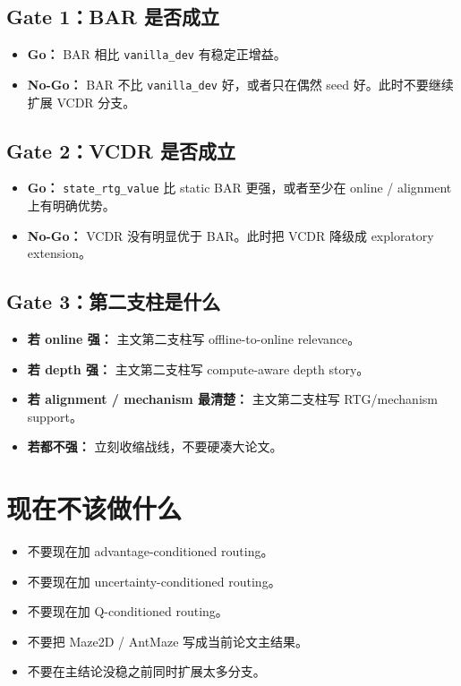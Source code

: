 \documentclass[11pt,UTF8,fontset=fandol]{ctexart}
\begin{document}
\subsection*{Gate 1：BAR 是否成立}

\begin{itemize}
  \item \textbf{Go：} BAR 相比 \texttt{vanilla\_dev} 有稳定正增益。
  \item \textbf{No-Go：} BAR 不比 \texttt{vanilla\_dev} 好，或者只在偶然 seed 好。此时不要继续扩展 VCDR 分支。
\end{itemize}

\subsection*{Gate 2：VCDR 是否成立}

\begin{itemize}
  \item \textbf{Go：} \texttt{state\_rtg\_value} 比 static BAR 更强，或者至少在 online / alignment 上有明确优势。
  \item \textbf{No-Go：} VCDR 没有明显优于 BAR。此时把 VCDR 降级成 exploratory extension。
\end{itemize}

\subsection*{Gate 3：第二支柱是什么}

\begin{itemize}
  \item \textbf{若 online 强：} 主文第二支柱写 offline-to-online relevance。
  \item \textbf{若 depth 强：} 主文第二支柱写 compute-aware depth story。
  \item \textbf{若 alignment / mechanism 最清楚：} 主文第二支柱写 RTG/mechanism support。
  \item \textbf{若都不强：} 立刻收缩战线，不要硬凑大论文。
\end{itemize}

\section{现在不该做什么}

\begin{itemize}
  \item 不要现在加 advantage-conditioned routing。
  \item 不要现在加 uncertainty-conditioned routing。
  \item 不要现在加 Q-conditioned routing。
  \item 不要把 Maze2D / AntMaze 写成当前论文主结果。
  \item 不要在主结论没稳之前同时扩展太多分支。
\end{itemize}
\end{document}
